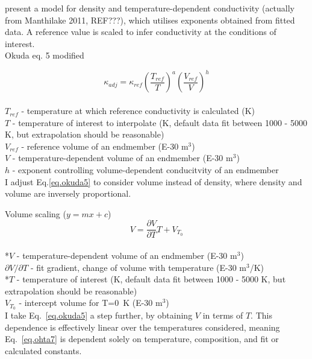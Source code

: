 \citet{Okuda2017} present a model for density and temperature-dependent conductivity (actually from Manthilake 2011, REF???), which utilises exponents obtained from fitted data. A reference value is scaled to infer conductivity at the conditions of interest.\\



Okuda eq. 5 modified

\begin{equation}%
\kappa_{adj}=\kappa_{ref}\left ( \frac{T_{ref}}{T} \right )^{a}\left ( \frac{V_{ref}}{V} \right )^{h}
\label{eq.okuda_mod}
\end{equation}%
\\ $T_{ref}$ - temperature at which reference conductivity is calculated (K)\\
$T$ - temperature of interest to interpolate (K, default data fit between 1000 - 5000 K, but extrapolation should be reasonable)\\   
$V_{ref}$ - reference volume of an endmember (E-30 m$^3$)\\
$V$ - temperature-dependent volume of an endmember (E-30 m$^3$)\\
$h$ - exponent controlling volume-dependent conducitvity of an endmember\\

I adjust Eq.\ref{eq.okuda5} to consider volume instead of density, where density and volume are inversely proportional.










Volume scaling ($y=mx+c$)  
\begin{equation}%
V=\frac{\partial V}{\partial T} T+V_{T_{0}}
\label{eq.vol_scale}
\end{equation}%
\\ *$V$ - temperature-dependent volume of an endmember (E-30 m$^3$)\\          
${\partial V}/{\partial T}$ - fit gradient, change of volume with temperature (E-30 m$^3$/K)\\
*$T$ - temperature of interest (K, default data fit between 1000 - 5000 K, but extrapolation should be reasonable)\\
$V_{T_{0}}$ - intercept volume for T=0~K (E-30 m$^3$)\\

I take Eq.~\ref{eq.okuda5} \citep[][Eq. 5]{Okuda2017} a step further, by obtaining $V$ in terms of $T$. This dependence is effectively linear over the temperatures considered, meaning Eq.~\ref{eq.ohta7} \citep[][Eq. 7]{Ohta2017} is dependent solely on temperature, composition, and fit or calculated constants.


